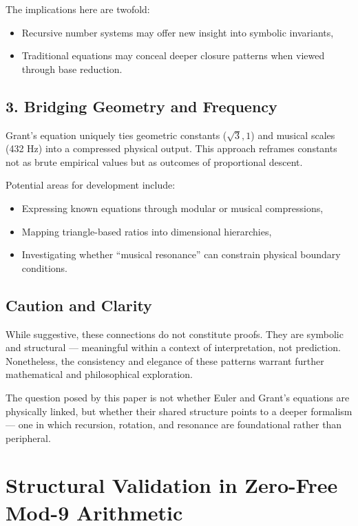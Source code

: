 \documentclass[12pt]{article}
\begin{document}
The implications here are twofold:

\begin{itemize}[leftmargin=1.5em]
    \item Recursive number systems may offer new insight into symbolic invariants,
    \item Traditional equations may conceal deeper closure patterns when viewed through base reduction.
\end{itemize}

\subsection*{3. Bridging Geometry and Frequency}

Grant’s equation uniquely ties geometric constants (\( \sqrt{3}, 1 \)) and musical scales (432 Hz) into a compressed physical output. This approach reframes constants not as brute empirical values but as outcomes of proportional descent.

Potential areas for development include:

\begin{itemize}[leftmargin=1.5em]
    \item Expressing known equations through modular or musical compressions,
    \item Mapping triangle-based ratios into dimensional hierarchies,
    \item Investigating whether “musical resonance” can constrain physical boundary conditions.
\end{itemize}

\subsection*{Caution and Clarity}

While suggestive, these connections do not constitute proofs. They are symbolic and structural — meaningful within a context of interpretation, not prediction. Nonetheless, the consistency and elegance of these patterns warrant further mathematical and philosophical exploration.

The question posed by this paper is not whether Euler and Grant’s equations are physically linked, but whether their shared structure points to a deeper formalism — one in which recursion, rotation, and resonance are foundational rather than peripheral.

\newpage
\section{Structural Validation in Zero-Free Mod-9 Arithmetic}
\end{document}

